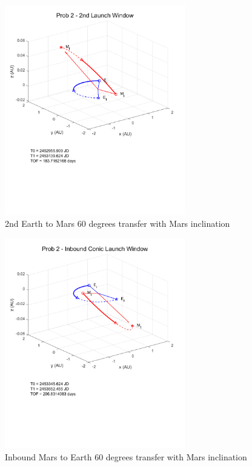 \documentclass[conf]{new-aiaa}
\begin{document}
\begin{figure}[H]
    \centering 
    \includegraphics[width=0.7\textwidth]{Prob 2 - 2nd Launch Window.pdf}
    \caption{2nd Earth to Mars 60 degrees transfer with Mars inclination}
\end{figure}

\begin{figure}[H]
    \centering 
    \includegraphics[width=0.7\textwidth]{Prob 2 - Inbound Conic Launch Window.pdf}
    \caption{Inbound Mars to Earth 60 degrees transfer with Mars inclination}
\end{figure}
\end{document}
